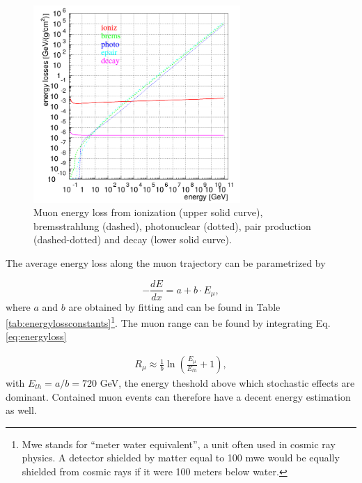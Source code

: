 \begin{figure}[t]
\centering
\includegraphics[width = 0.7\textwidth]{chapter4/img/muonenergyloss.png}
\caption{Muon energy loss from ionization (upper solid curve), bremsstrahlung (dashed), photonuclear (dotted), pair production (dashed-dotted) and decay (lower solid curve).}
\label{fig:energyloss}
\end{figure}

\noindent The average energy loss along the muon trajectory can be parametrized by 

\begin{equation}
\label{eq:energyloss}
- \frac{dE}{dx} = a + b \cdot E_\mu,
\end{equation}
where $a$ and $b$ are obtained by fitting and can be found in Table \ref{tab:energylossconstants}\footnote{Mwe stands for ``meter water equivalent'', a unit often used in cosmic ray physics. A detector shielded by matter equal to 100 mwe would be equally shielded from cosmic rays if it were 100 meters below water.}. The muon range can be found by integrating Eq. \ref{eq:energyloss}

\begin{equation}
\begin{split}
R_\mu \approx \frac{1}{b} \ln \left( \frac{E_\mu}{E_{th}} +1 \right),
\end{split}
\end{equation}
with $E_{th} = a/b = 720$ GeV, the energy theshold above which stochastic effects are dominant. Contained muon events can therefore have a decent energy estimation as well.


